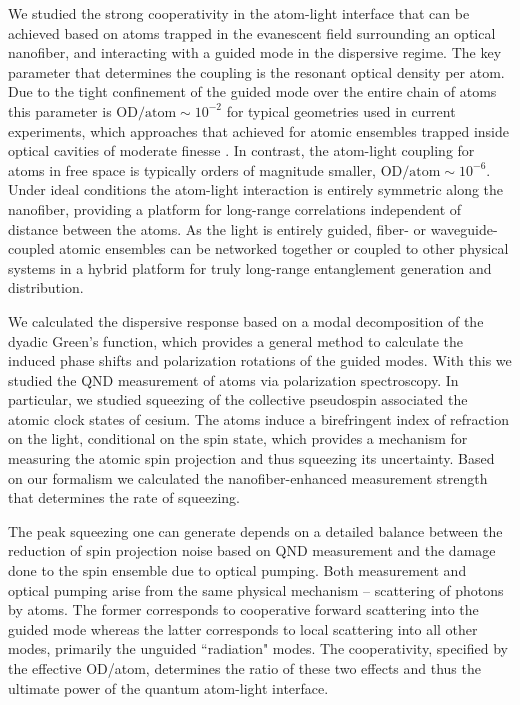 \documentclass[preprint, aps,pra,onecolumn]{revtex4-1} %
\begin{document}
We studied the strong cooperativity in the atom-light interface that can be achieved based on atoms trapped in the evanescent field surrounding an optical nanofiber, and interacting with a guided mode in the dispersive regime. 
The key parameter that determines the coupling is the resonant optical density per atom. 
Due to the tight confinement of the guided mode over the entire chain of atoms this parameter is $ \mathrm{OD}/\mathrm{atom}\sim 10^{-2} $ for typical geometries used in current experiments, which approaches that achieved for atomic ensembles trapped inside optical cavities of moderate finesse \cite{chen_conditional_2011, zhang_collective_2012}.  
In contrast, the atom-light coupling for atoms in free space is typically orders of magnitude smaller, $ \mathrm{OD}/\mathrm{atom} \sim 10^{-6}$.  
Under ideal conditions the atom-light interaction is entirely symmetric along the nanofiber, providing a platform for long-range correlations independent of distance between the atoms. 
As the light is entirely guided, fiber- or waveguide-coupled atomic ensembles can be networked together or coupled to other physical systems in a hybrid platform \cite{hafezi_atomic_2012, liebermeister_tapered_2014, Meng2015nanowaveguide, Tiecke2015Efficient} for truly long-range entanglement generation and distribution. 

We calculated the dispersive response based on a modal decomposition of the dyadic Green's function, which provides a general method to calculate the induced phase shifts and polarization rotations of the guided modes. 
With this we studied the QND measurement of atoms via polarization spectroscopy. 
In particular, we studied squeezing of the collective pseudospin associated the atomic clock states of cesium. 
The atoms induce a birefringent index of refraction on the light, conditional on the spin state, which provides a mechanism for measuring the atomic spin projection and thus squeezing its uncertainty.  
Based on our formalism we calculated the nanofiber-enhanced measurement strength that determines the rate of squeezing.  

The peak squeezing one can generate depends on a detailed balance between the reduction of spin projection noise based on QND measurement and the damage done to the spin ensemble due to optical pumping.  
Both measurement and optical pumping arise from the same physical mechanism -- scattering of photons by atoms.  
The former corresponds to cooperative forward scattering into the guided mode whereas the latter corresponds to local scattering into all other modes, primarily the unguided ``radiation" modes.   The cooperativity, specified by the effective OD/atom, determines the ratio of these two effects and thus the ultimate power of the quantum atom-light interface. 
\end{document}
